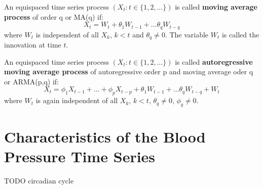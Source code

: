 \begin{definition}
    An equispaced time series process $(X_t: t \in \{1,2, \dots\})$ is called \textbf{moving average process}
    of order q or MA(q) if:
    \[
        X_t = W_t + \theta_1 W_{t-1} + \dots \theta_q W_{t-q}
    \]
    where $W_t$ is independent of all $X_k$, $k < t$ and $\theta_q \neq 0$. The variable $W_t$ is called
    the innovation at time $t$.

\end{definition}


\begin{definition}
    An equispaced time series process $(X_t: t \in \{1,2, \dots\})$ is called \textbf{autoregressive moving average process}
    of autoregressive order p and moving average oder q or ARMA(p,q) if:
    \[
        X_t =  \phi_1 X_{t-1} + \dots + \phi_p X_{t-p} + \theta_1 W_{t-1} + \dots \theta_q W_{t-q} + W_t
    \]
    where $W_t$ is again independent of all $X_k$, $k < t$, $\theta_q \neq 0$, $\phi_q \neq 0$.
\end{definition}




\section{Characteristics of the Blood Pressure Time Series}
TODO
circadian cycle

